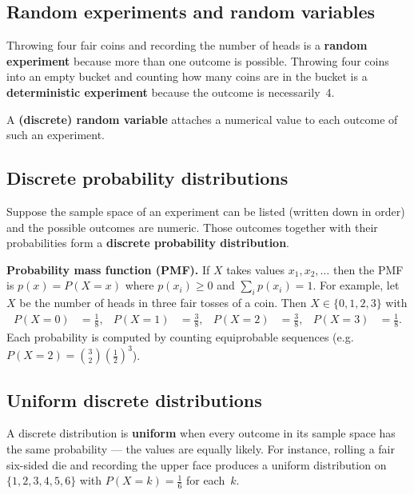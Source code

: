 
\subsection{Random experiments and random variables}

Throwing four fair coins and recording the number of heads is a \textbf{random experiment} because more than one outcome is possible. Throwing four coins into an empty bucket and counting how many coins are in the bucket is a \textbf{deterministic experiment} because the outcome is necessarily~4.

A \textbf{(discrete) random variable} attaches a numerical value to each outcome of such an experiment.

\subsection{Discrete probability distributions}

Suppose the sample space of an experiment can be listed (written down in order) and the possible outcomes are numeric. Those outcomes together with their probabilities form a \textbf{discrete probability distribution}.

\textbf{Probability mass function (PMF).} If $X$ takes values $x_1,x_2,\ldots$ then the PMF is $p(x)=P(X=x)$ where $p(x_i)\geq 0$ and $\sum_i p(x_i)=1$.
For example, let $X$ be the number of heads in three fair tosses of a coin. Then $X\in\{0,1,2,3\}$ with
\begin{align*}
P(X=0) &= \tfrac{1}{8}, &
P(X=1) &= \tfrac{3}{8}, &
P(X=2) &= \tfrac{3}{8}, &
P(X=3) &= \tfrac{1}{8}.
\end{align*}
Each probability is computed by counting equiprobable sequences (e.g.\ $P(X=2)=\binom{3}{2}(\tfrac12)^3$).

\subsection{Uniform discrete distributions}

A discrete distribution is \textbf{uniform} when every outcome in its sample space has the same probability --- the values are equally likely. For instance, rolling a fair six-sided die and recording the upper face produces a uniform distribution on $\{1,2,3,4,5,6\}$ with $P(X=k)=\tfrac16$ for each~$k$.

